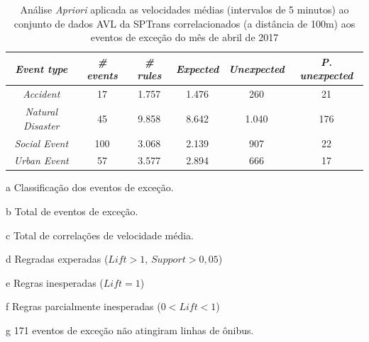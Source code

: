 \documentclass[
	12pt,				%
	oneside,			%
	a4paper,			%
	english,			%
	brazil				%
	]{abntex2ppgsi}
\begin{document}
{{\begin{apendicesenv}
\begin{table}[!htb]
\centering
\begin{threeparttable}
\caption {Análise \textit{Apriori} aplicada as velocidades médias (intervalos de 5 minutos) ao conjunto de dados AVL da SPTrans correlacionados (a distância de 100m) aos eventos de exceção do mês de abril de 2017}
\label {tab:aprioriFull}
\begin{tabular}{c|c|c|c|c|c}
\hline
\textbf{\textit{Event type}}\tnote{a} & \textbf{\textit{\# events}}\tnote{b} & \textit{\textbf{\# rules}}\tnote{c} & \textbf{\textit{Expected}}\tnote{d} & \textbf{\textit{Unexpected}}\tnote{e} & \textbf{\textit{P. unexpected}}\tnote{f}   \\
\hline
\textit{Accident} & 17 & 1.757 & 1.476 & 260 & 21 \\
\textit{Natural Disaster} & 45 & 9.858 & 8.642 & 1.040 & 176 \\
\textit{Social Event} & 100 & 3.068 & 2.139 & 907 & 22 \\
\textit{Urban Event} & 57 & 3.577 & 2.894 & 666 & 17 \\
\hline
\end{tabular}
\begin{tablenotes}
            \item[a] Classificação dos eventos de exceção.
            \item[b] Total de eventos de exceção.
            \item[c] Total de correlações de velocidade média.
            \item[d] Regradas experadas ($Lift > 1$, $Support > 0,05$)
            \item[e] Regras inesperadas ($Lift = 1$)
            \item[f] Regras parcialmente inesperadas ($0 < Lift < 1$)
            \item[g] 171 eventos de exceção não atingiram linhas de ônibus.
        \end{tablenotes}
\end{threeparttable}
\end{table}


\end{apendicesenv}}}
\end{document}
